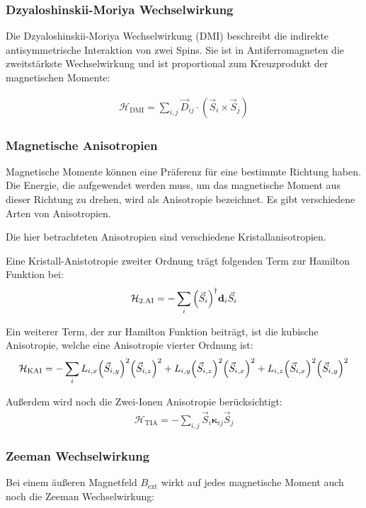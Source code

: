 \documentclass[main.tex]{subfiles}
\begin{document}
\subsubsection*{Dzyaloshinskii-Moriya Wechselwirkung}

Die Dzyaloshinskii-Moriya Wechselwirkung (DMI) beschreibt die indirekte
antisymmetrische Interaktion von zwei Spins\cite{DMI}. Sie ist in
Antiferromagneten die zweitstärkste Wechselwirkung und ist proportional zum
Kreuzprodukt der magnetischen Momente:

\begin{align}
	\mathcal{H}_{\text{DMI}} = \sum_{i,j} \vec{D}_{ij} \cdot (\vec{S}_i
	\times
	\vec{S}_j)\label{eq:hamilton-dmi}
\end{align}

\subsubsection*{Magnetische Anisotropien}
Magnetische Momente können eine Präferenz für eine bestimmte Richtung haben.
Die Energie, die aufgewendet werden muss, um das magnetische Moment aus dieser
Richtung zu drehen, wird als Anisotropie bezeichnet. Es gibt verschiedene Arten
von Anisotropien.

Die hier betrachteten Anisotropien sind verschiedene Kristallanisotropien.

Eine Kristall-Anistotropie zweiter Ordnung trägt folgenden Term zur Hamilton Funktion bei:
\begin{align}
	\mathcal{H}_{\text{2.AI}} = -\sum_{i} \qty(\vec{S}_i)^\dagger
	\mathbf{d}_i
	\vec{S}_i\label{eq:hamilton-2a}
\end{align}

Ein weiterer Term, der zur Hamilton Funktion beiträgt, ist die kubische Anisotropie, welche eine Anisotropie vierter Ordnung ist:
\begin{align}
	\mathcal{H}_{\text{KAI}} = -\sum_{i} L_{i,x} \qty(\vec{S}_{i,y})^2
	\qty(\vec{S}_{i,z})^2 + L_{i,y} \qty(\vec{S}_{i,z})^2
	\qty(\vec{S}_{i,x})^2
	+
	L_{i,z} \qty(\vec{S}_{i,x})^2 \qty(\vec{S}_{i,y})^2\label{eq:hamilton-4a}
\end{align}\cite{GrossMarx}

Außerdem wird noch die Zwei-Ionen Anisotropie berücksichtigt:
\begin{align}
	\mathcal{H}_{\text{TIA}} = -\sum_{i,j} \vec{S}_i \mathbf{\kappa}_{ij}
	\vec{S}_j\label{eq:hamilton-tia}
\end{align}
\subsubsection*{Zeeman Wechselwirkung}
Bei einem äußeren Magnetfeld \(B_\text{ext}\) wirkt auf jedes magnetische
Moment auch noch die Zeeman Wechselwirkung:
\end{document}
